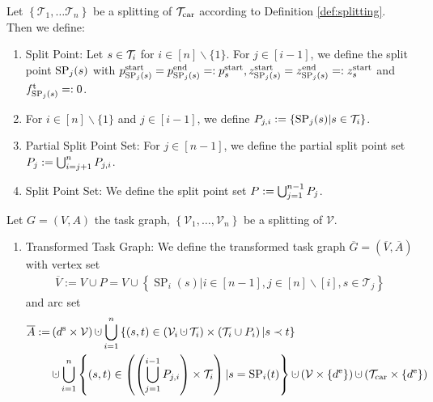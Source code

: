 \begin{definition}

Let $\left\{\mathcal{T}_1,\dots\mathcal{T}_n\right\}$ be a splitting of $\mathcal{T}_{\operatorname{car}}$ according to Definition \ref{def:splitting}. Then we define:

\begin{enumerate}
	\item{Split Point: Let $s\in\mathcal{T}_i$ for $i\in[n]\backslash\{1\}$. For $j\in[i-1]$, we define the split point $\operatorname{SP}_j(s)$ with $p^{\operatorname{start}}_{\operatorname{SP}_j(s)}=p^{\operatorname{end}}_{\operatorname{SP}_j(s)}=:p^{\operatorname{start}}_s, z^{\operatorname{start}}_{\operatorname{SP}_j(s)}=z^{\operatorname{end}}_{\operatorname{SP}_j(s)}=:z^{\operatorname{start}}_s$ and $f^{\operatorname{t}}_{\operatorname{SP}_j(s)}=:0$.}
	\item{For $i\in[n]\backslash\{1\}$ and $j\in[i-1]$, we define $P_{j,i}:=\left\{\operatorname{SP}_j(s)|s\in\mathcal{T}_i\right\}$.}
	\item{Partial Split Point Set: For $j\in[n-1]$, we define the partial split point set $P_j:=\bigcup_{i=j+1}^n P_{j,i}$.}
	\item{Split Point Set: We define the split point set $P:=\bigcup_{j=1}^{n-1}P_j$.}
\end{enumerate}

Let $G=(V,A)$ the task graph, $\left\{\mathcal{V}_1,\dots,\mathcal{V}_n\right\}$ be a splitting of $\mathcal{V}$.

\begin{enumerate}
	\item{Transformed Task Graph: We define the transformed task graph $\overline{G}=\left(\overline{V},\overline{A}\right)$ with vertex set
		\begin{align*}
			\overline{V} := V\cup P = V\cup\left\{\operatorname{SP}_i(s)|i\in[n-1],j\in[n]\backslash[i],s\in\mathcal{T}_j\right\}
		\end{align*}
		and arc set
		\begin{align*}
			\overline{A} := & \left(\ds\times\mathcal{V}\right)\cupdot\bigcup_{i=1}^n\left\{(s,t)\in\left(\Vi\cupdot\Ti\right)\times\left(\Ti\cup P_i\right)|s\prec t\right\} \\
			& \cupdot\bigcup_{i=1}^n\left\{(s,t)\in\left(\left(\bigcup_{j=1}^{i-1} P_{j,i}\right)\times\Ti\right)|s=\operatorname{SP}_i(t)\right\}\cupdot \left(\mathcal{V}\times\left\{\de\right\}\right)\cupdot\left(\Tcar\times\left\{\de\right\}\right)
		\end{align*}}
\end{enumerate}

\end{definition}


